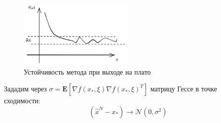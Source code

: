 \begin{figure}[h]
    \centering
    \includegraphics[width=0.5\textwidth]{assets/math/optimization/stability.excalidraw.png}
    \caption{Устойчивость метода при выходе на плато}
    \label{discr_vs_gen}
\end{figure}
    Зададим через $\sigma = \mathbf{E}\left[\nabla f(x_*,\xi)\nabla f(x_*, \xi)^T\right]$ матрицу Гессе в точке сходимости:
\begin{equation}
    (\hat{x}^N - x_*) \rightarrow \mathcal{N}(0,\sigma^2)
\end{equation}


